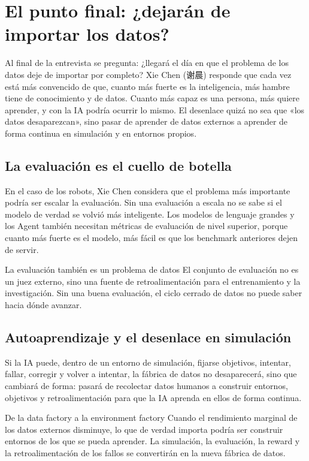 \documentclass[a4paper]{article}
\begin{document}
\section{El punto final: ¿dejarán de importar los datos?}

Al final de la entrevista se pregunta: ¿llegará el día en que el problema de los datos deje de importar por completo? Xie Chen (谢晨) responde que cada vez está más convencido de que, cuanto más fuerte es la inteligencia, más hambre tiene de conocimiento y de datos. Cuanto más capaz es una persona, más quiere aprender, y con la IA podría ocurrir lo mismo. El desenlace quizá no sea que «los datos desaparezcan», sino pasar de aprender de datos externos a aprender de forma continua en simulación y en entornos propios.

\subsection{La evaluación es el cuello de botella}

En el caso de los robots, Xie Chen considera que el problema más importante podría ser escalar la evaluación. Sin una evaluación a escala no se sabe si el modelo de verdad se volvió más inteligente. Los modelos de lenguaje grandes y los Agent también necesitan métricas de evaluación de nivel superior, porque cuanto más fuerte es el modelo, más fácil es que los benchmark anteriores dejen de servir.

\begin{importantbox}{La evaluación también es un problema de datos}
El conjunto de evaluación no es un juez externo, sino una fuente de retroalimentación para el entrenamiento y la investigación. Sin una buena evaluación, el ciclo cerrado de datos no puede saber hacia dónde avanzar.
\end{importantbox}

\subsection{Autoaprendizaje y el desenlace en simulación}

Si la IA puede, dentro de un entorno de simulación, fijarse objetivos, intentar, fallar, corregir y volver a intentar, la fábrica de datos no desaparecerá, sino que cambiará de forma: pasará de recolectar datos humanos a construir entornos, objetivos y retroalimentación para que la IA aprenda en ellos de forma continua.

\begin{knowledgebox}{De la data factory a la environment factory}
Cuando el rendimiento marginal de los datos externos disminuye, lo que de verdad importa podría ser construir entornos de los que se pueda aprender. La simulación, la evaluación, la reward y la retroalimentación de los fallos se convertirán en la nueva fábrica de datos.
\end{knowledgebox}
\end{document}

